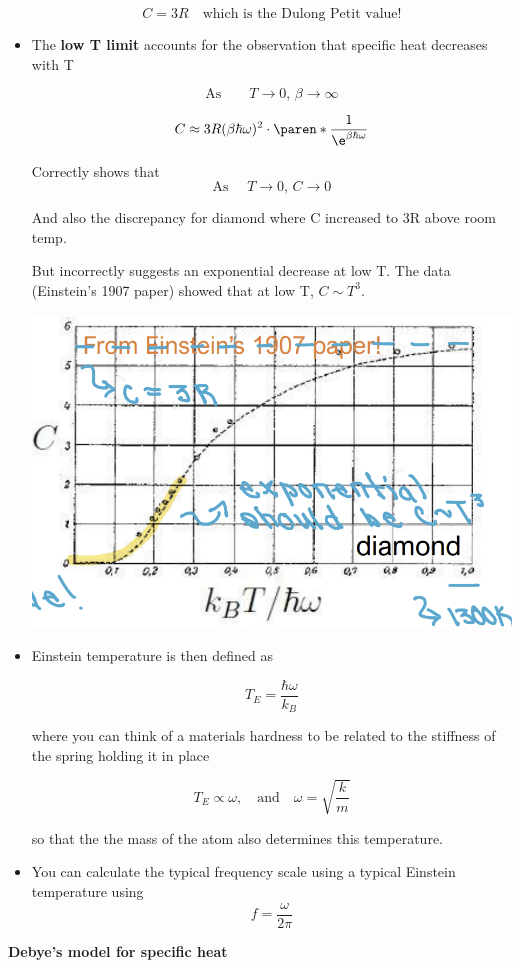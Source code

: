 \begin{itemize}
    \[ \boxed{C = 3R} \quad \text{which is the Dulong Petit value!}\]

    \item The \textbf{low T limit} accounts for the observation that specific heat decreases with T

    \[ \text{As} \qquad T \rightarrow 0, \, \beta \rightarrow \infty\]

    \[ C \approx 3R (\beta \hbar \omega)^2 \cdot \paren*{\frac{1}{\e^{\beta \hbar \omega}}}\]

    Correctly shows that 
    \[ \text{As } \quad T \rightarrow 0, \, C \rightarrow 0\]

    And also the discrepancy for diamond where C increased to 3R above room temp.

    But incorrectly suggests an exponential decrease at low T. The data (Einstein's 1907 paper) showed that at low T, $C \sim T^3$.

    \begin{center}
        \includegraphics[width = 0.5\linewidth]{Images/einstein-1907.png}
    \end{center}

    \item Einstein temperature is then defined as 

    \[ T_E = \frac{\hbar \omega}{k_B}\]

    where you can think of a materials hardness to be related to the stiffness of the spring holding it in place

    \[ T_E \propto \omega , \quad \text{and} \quad \omega = \sqrt{\frac{k}{m}}\]

    so that the the mass of the atom also determines this temperature.

    \item You can calculate the typical frequency scale using a typical Einstein temperature using 
    \[ f = \frac{\omega}{2 \pi}\]

\end{itemize}

\textbf{Debye's model for specific heat}


